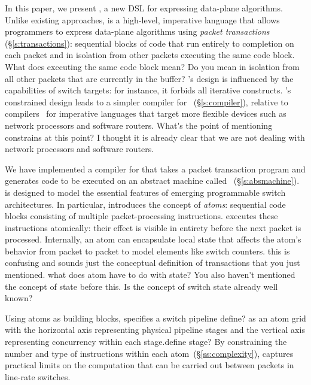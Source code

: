 In this paper, we present \pktlanguage, a new DSL for expressing data-plane
algorithms. Unlike existing approaches, 
\pktlanguage is a high-level, imperative language that allows
programmers to express data-plane algorithms using {\em packet transactions}
(\S\ref{s:transactions}): sequential blocks of code that run entirely 
to completion on
each packet and in isolation from other packets executing the same code block.
\ac{What does executing the same code block mean? Do you mean in isolation from
all other packets that are currently in the buffer?}
\pktlanguage's design is influenced by the capabilities of switch targets: for
instance, it forbids all iterative constructs. \pktlanguage's constrained
design leads to a simpler compiler for \pktlanguage~(\S\ref{s:compiler}),
relative to compilers~\cite{nova, packetc, microenginec} for imperative
languages that target more flexible devices such as network processors and
software routers. \ac{What's the point of
mentioning constrains at this point? I thought it is already clear that we 
are not dealing with network processors and software routers.} 

We have implemented a compiler for \pktlanguage that takes a packet 
transaction program and generates code to be executed on an abstract 
machine called \absmachine~(\S\ref{s:absmachine}). \absmachine is designed
to model the essential
features of emerging programmable switch architectures.  In particular,
\absmachine introduces the concept of {\em atoms}: 
sequential code blocks consisting of
multiple packet-processing instructions. \absmachine executes these
instructions atomically: their effect is visible in entirety before the next
packet is processed. Internally, an atom can encapsulate local state that
affects the atom's behavior from packet to packet to model elements like switch
counters. \ac{this is confusing and sounds just the conceptual definition 
of transactions that you just mentioned.}
\ac{what does atom have to do with state? You also haven't mentioned 
the concept of state before this. Is the concept of switch state already  
well known?}  


Using atoms as building blocks, \absmachine specifies a switch pipeline 
\ac{define?} as an
atom grid with the horizontal axis representing physical pipeline stages and
the vertical axis representing concurrency within each stage.\ac{define stage?} 
By constraining
the number and type of instructions within each atom~(\S\ref{ss:complexity}),
\absmachine captures practical limits on the computation that can be carried
out between packets in line-rate switches.

